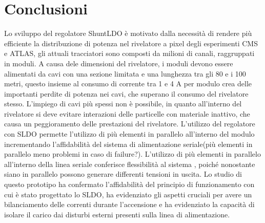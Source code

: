 \chapter{Conclusioni}


Lo sviluppo del regolatore ShuntLDO è motivato dalla necessità di rendere più efficiente la distribuzione di potenza nel rivelatore a pixel degli esperimenti CMS e ATLAS, gli attuali tracciatori sono composti da milioni di canali, raggruppati in moduli. 
A causa dele dimensioni del rivelatore, i moduli devono essere alimentati da cavi con una sezione limitata e una lunghezza tra gli 80 e i 100 metri, questo insieme al consumo di corrente tra 1 e 4 A per modulo crea delle importanti perdite di potenza nei cavi, che superano il consumo del rivelatore stesso. 
L'impiego di cavi più spessi non è possibile, in quanto all'interno del rivelatore si deve evitare interazioni delle particelle con materiale inattivo, che causa un peggioramento delle prestazioni del rivelatore. 
L'utilizzo del regolatore con SLDO permette l'utilizzo di più elementi in parallelo all'interno del modulo incrementando  l'affidabilità del sistema di alimentazione seriale(più elementi in parallelo meno problemi in caso di failure?). 
L'utilizzo di più elementi in parallelo all'interno della linea seriale conferisce  flessibilità al sistema , poiché nonostante siano in parallelo possono generare differenti tensioni in uscita. 
Lo studio di questo prototipo ha confermato l'affidabilità del principio di funzionamento con cui è stato progettato lo SLDO, ha evidenziato gli aspetti cruciali per avere un bilanciamento delle correnti durante l'accensione e ha evidenziato la capacità di isolare il carico dai disturbi esterni presenti sulla linea di alimentazione.
 





